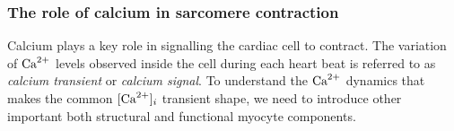 






%
%
%
\subsubsection{The role of calcium in sarcomere contraction}\label{ch1:the_role_of_calcium_in_sarcomere_contraction}
Calcium plays a key role in signalling the cardiac cell to contract. The variation of $\textrm{Ca}^{2+}$ levels observed inside the cell during each heart beat is referred to as \textit{calcium transient} or \textit{calcium signal}. To understand the $\textrm{Ca}^{2+}$ dynamics that makes the common $[\textrm{Ca}^{2+}]_{i}$ transient shape, we need to introduce other important both structural and functional myocyte components.


